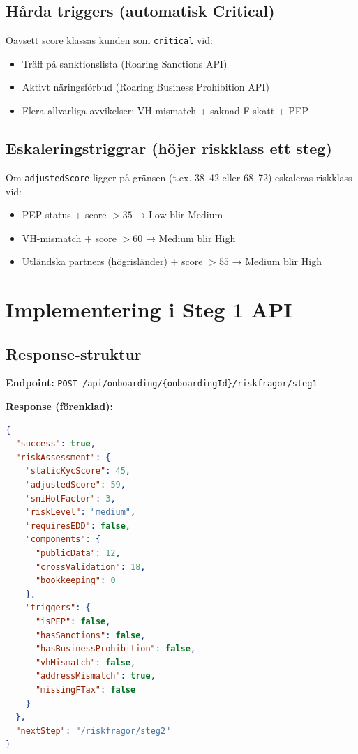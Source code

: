 \documentclass[12pt,a4paper]{article}
\begin{document}
\subsection{Hårda triggers (automatisk Critical)}

Oavsett score klassas kunden som \texttt{critical} vid:
\begin{itemize}[noitemsep]
  \item Träff på sanktionslista (Roaring Sanctions API)
  \item Aktivt näringsförbud (Roaring Business Prohibition API)
  \item Flera allvarliga avvikelser: VH-mismatch + saknad F-skatt + PEP
\end{itemize}

\subsection{Eskaleringstriggrar (höjer riskklass ett steg)}

Om \texttt{adjustedScore} ligger på gränsen (t.ex. 38–42 eller 68–72) eskaleras riskklass vid:
\begin{itemize}[noitemsep]
  \item PEP-status + score $> 35$ → Low blir Medium
  \item VH-mismatch + score $> 60$ → Medium blir High
  \item Utländska partners (högrisländer) + score $> 55$ → Medium blir High
\end{itemize}

\section{Implementering i Steg 1 API}

\subsection{Response-struktur}

\textbf{Endpoint:} \texttt{POST /api/onboarding/\{onboardingId\}/riskfragor/steg1}

\textbf{Response (förenklad):}
\begin{lstlisting}[language=json]
{
  "success": true,
  "riskAssessment": {
    "staticKycScore": 45,
    "adjustedScore": 59,
    "sniHotFactor": 3,
    "riskLevel": "medium",
    "requiresEDD": false,
    "components": {
      "publicData": 12,
      "crossValidation": 18,
      "bookkeeping": 0
    },
    "triggers": {
      "isPEP": false,
      "hasSanctions": false,
      "hasBusinessProhibition": false,
      "vhMismatch": false,
      "addressMismatch": true,
      "missingFTax": false
    }
  },
  "nextStep": "/riskfragor/steg2"
}
\end{lstlisting}
\end{document}

